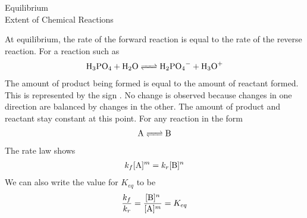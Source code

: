\documentclass[9pt]{extarticle}
\begin{document}
\begin{center}
    \hspace{0pt}
    \vfill
    \Large Equilibrium \\
    \large Extent of Chemical Reactions
    \vfill
    \hspace{0pt}
\end{center}
\newpage

At equilibrium, the rate of the forward reaction is equal to the rate of the reverse reaction. For a reaction such as 
\begin{align*}
  \ce{H3PO4 + H2O <=> H2PO4- + H3O+}
\end{align*}
The amount of product being formed is equal to the amount of reactant formed. This is represented by the sign \ce{<=>}. No change is observed
because changes in one direction are balanced by changes in the other. The amount of product and reactant stay constant at this point.
\newpage
For any reaction in the form
\begin{align*}
  \ce{A <=> B}
\end{align*}
The rate law shows
\begin{align*}
  k_f[\ce{A}]^m = k_r[\ce{B}]^n
\end{align*}
We can also write the value for $K_{eq}$ to be 
\begin{align*}
\frac{k_f}{k_r} = \frac{[\ce{B}]^n}{[\ce{A}]^m} = K_{eq}
\end{align*} 
\end{document}
